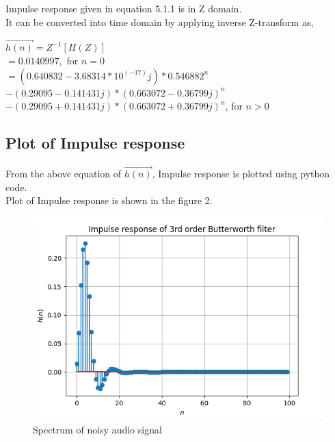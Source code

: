 \documentclass[journal,10pt,twocolumn]{article}
\begin{document}
\begin{flushleft}
Impulse response given in equation 5.1.1 is in Z domain.\\
It can be converted into time domain by applying inverse Z-transform as,\\
\begin{flushleft}
    
$\vec{h(n)} = Z^{-1}[H(Z)]$\\
\vspace{0.2cm}
$= 0.0140997,$ for $n=0 $\\
\vspace{0.2cm}
$= (0.640832 - 3.68314*10^{(-17)}j) * 0.546882^n $\\
 $ -(0.29095 - 0.141431j) * (0.663072 - 0.36799j)^n$ \\
 $ -(0.29095 + 0.141431j) *(0.663072 + 0.36799j)^n$, for $n>0$   
\end{flushleft}

\subsection{Plot of Impulse response}
\vspace{0.2cm}
From the above equation of $\vec{h(n)}$, Impulse response is plotted using python code.\\
\vspace{0.2cm}
Plot of Impulse response is shown in the figure 2.\\
\begin{figure}[h]
\includegraphics[width=1\columnwidth]{impulse.png}
\caption{Spectrum of noisy audio signal}
\label{fig:Impulse response of 3rd order Butterworth filter}
\end{figure}


\end{flushleft}
\end{document}
